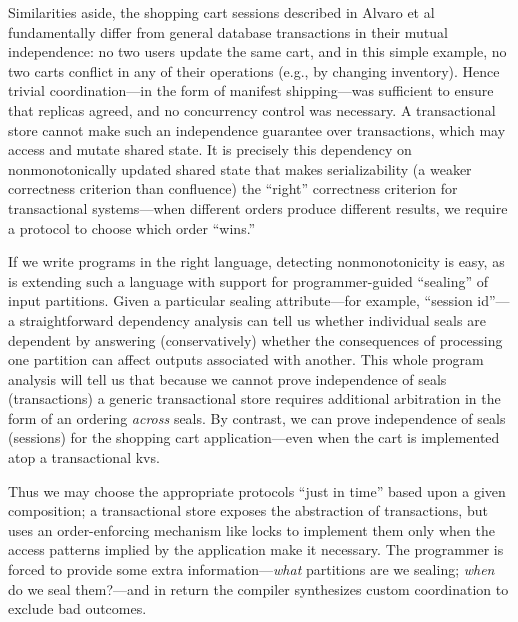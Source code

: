 \documentclass{sig-alternate}
\begin{document}
Similarities aside, the shopping cart sessions described in Alvaro et al fundamentally differ from general database transactions in their mutual independence: no two users update the same cart, and in this simple example, no two carts conflict in any of their operations (e.g., by changing inventory).  Hence trivial coordination---in the form of manifest shipping---was sufficient to ensure that replicas agreed, and no concurrency control was necessary.  A transactional store cannot make such an independence guarantee over transactions, which may access and mutate shared state.   It is precisely this dependency on nonmonotonically updated shared state that makes serializability (a weaker correctness criterion than confluence) the ``right'' correctness criterion for transactional systems---when different orders produce different results, we require a protocol to choose which order ``wins.'' 

If we write programs in the right language, detecting nonmonotonicity is easy, as is extending such a language with support for programmer-guided ``sealing'' of input partitions.  Given a particular sealing attribute---for example, ``session id''---a straightforward dependency analysis can tell us whether individual seals are dependent by answering (conservatively) whether the consequences of processing one partition can affect outputs associated with another.  This whole program analysis will tell us that because we cannot prove independence of seals (transactions) a generic transactional store requires additional arbitration in the form of an ordering \emph{across} seals.  By contrast, we can prove independence of seals (sessions) for the shopping cart application---even when the cart is implemented atop a transactional kvs.  

Thus we may choose the appropriate protocols ``just in time'' based upon a given composition; a transactional store exposes the abstraction of transactions, but uses an order-enforcing mechanism like locks to implement them only when the access patterns implied by the application make it necessary. The programmer is forced to provide some extra information---\emph{what} partitions are we sealing; \emph{when} do we seal them?---and in return the compiler synthesizes custom coordination to exclude bad outcomes.  




\end{document}
